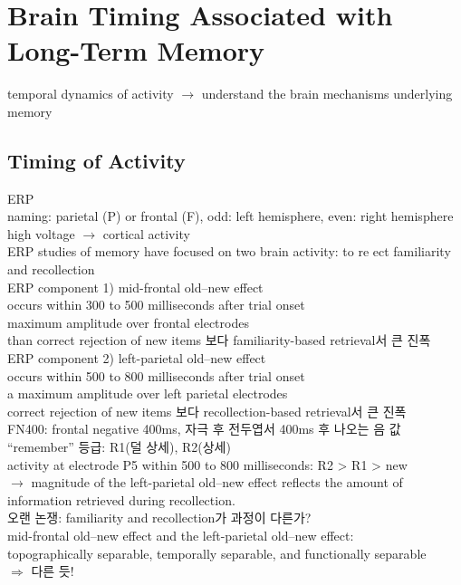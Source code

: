 \documentclass[../note.tex]{subfiles}
\begin{document}
\chapter{Brain Timing Associated with Long-Term Memory}

temporal dynamics of activity $\rightarrow$ understand the brain mechanisms underlying memory

\section{Timing of Activity}
ERP\\
naming: parietal (P) or frontal (F), odd: left hemisphere, even: right hemisphere\\
high voltage $\rightarrow$ cortical activity\\

ERP studies of memory have focused on two brain activity: to re ect familiarity and recollection\\

ERP component 1) mid-frontal old–new effect\\
  occurs within 300 to 500 milliseconds after trial onset\\
  maximum amplitude over frontal electrodes\\
  than correct rejection of
new items 보다 familiarity-based retrieval서 큰 진폭\\

ERP component 2) left-parietal old–new effect\\
occurs within 500 to 800 milliseconds after trial
onset \\
a maximum amplitude over left parietal electrodes\\
correct rejection of new
items 보다 recollection-based retrieval서 큰 진폭\\


FN400: frontal negative 400ms, 자극 후 전두엽서 400ms 후 나오는 음 값\\

``remember'' 등급: R1(덜 상세), R2(상세)\\
activity at electrode P5 within 500 to 800 milliseconds: R2 > R1 > new\\
$\rightarrow$ magnitude of the left-parietal old–new effect reflects the amount of information retrieved during recollection.\\

오랜 논쟁: familiarity and recollection가 과정이 다른가?\\
mid-frontal old–new effect and the left-parietal old–new effect:\\
topographically separable, temporally separable, and functionally separable\\
$\Longrightarrow$ 다른 듯!\\
\end{document}
